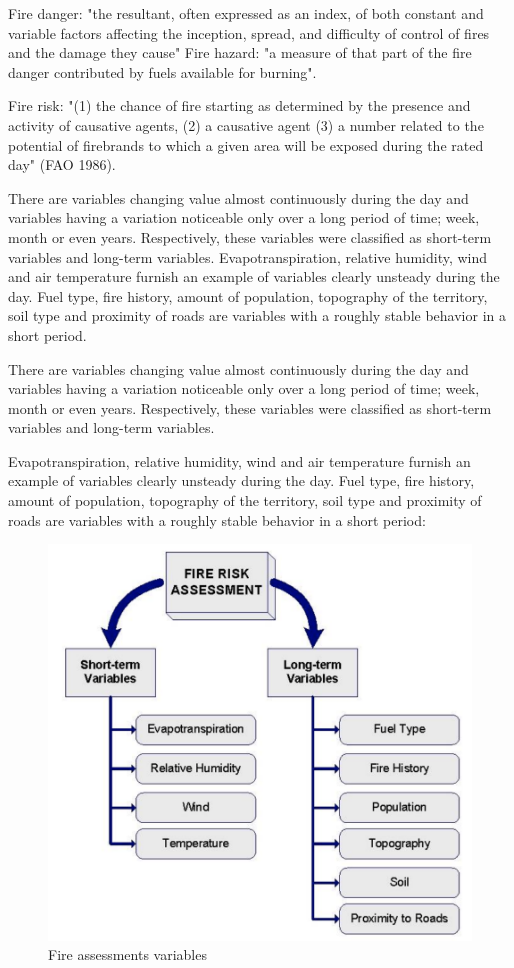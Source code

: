 {{{	Fire danger: "the resultant, often expressed as an index, of both constant and variable factors affecting the inception, spread, and difficulty of control of fires and the damage they cause"
	Fire hazard: "a measure of that part of the fire danger contributed by fuels available for burning".
	
	Fire risk: "(1) the chance of fire starting as determined by the presence and activity of causative agents, (2) a causative agent (3) a number related to the potential of firebrands to which a given area will be exposed during the rated day" (FAO 1986).
	
	There are variables changing value almost continuously during the day and variables having a variation noticeable only over a long period of time; week, month or even years. Respectively, these variables were classified as short-term variables and long-term variables. Evapotranspiration, relative humidity, wind and air temperature furnish an example of variables clearly unsteady during the day. Fuel type, fire history, amount of population, topography of the territory, soil type and proximity of roads are variables with a roughly stable behavior in a short period.
	
	
	There are variables changing value almost continuously during the day and variables having a variation noticeable only over a long period of time; week, month or even years. Respectively, these variables were classified as short-term variables and long-term variables.
	
	Evapotranspiration, relative humidity, wind and air temperature furnish an example of variables clearly unsteady during the day. Fuel type, fire history, amount of population, topography of the territory, soil type and proximity of roads are variables with a roughly stable behavior in a short period:
	
	\begin{figure}[H]
		\centering
		\includegraphics[width=0.8\linewidth]{images/fire_assesment.png}
		\caption{Fire assessments variables}
		\label{fig:copernicus_hub}
	\end{figure}

}}}

